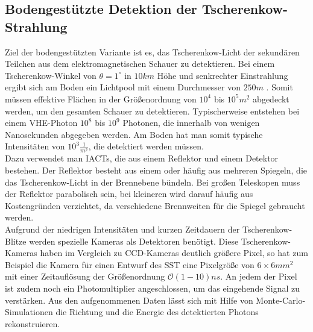 \subsection{Bodengestützte Detektion der Tscherenkow-Strahlung}
Ziel der bodengestützten Variante ist es, das Tscherenkow-Licht der sekundären Teilchen aus dem elektromagnetischen Schauer zu detektieren. Bei einem Tscherenkow-Winkel von $\theta=1^{\circ}$ in $10\unit{km}$ Höhe und senkrechter Einstrahlung ergibt sich am Boden ein Lichtpool mit einem Durchmesser von $250\unit{m}$ \cite{DesignConcept}. Somit müssen effektive Flächen in der Größenordnung von $10^4$ bis $10^5\unit{m^2}$ abgedeckt werden, um den gesamten Schauer zu detektieren. Typischerweise entstehen bei einem VHE-Photon $10^8$ bis $10^9$ Photonen, die innerhalb von wenigen Nanosekunden abgegeben werden. Am Boden hat man somit typische Intensitäten von $10^3\unit{\frac{1}{m^2}}$, die detektiert werden müssen.\\
Dazu verwendet man IACTs, die aus einem Reflektor und einem Detektor bestehen. Der Reflektor besteht aus einem oder häufig aus mehreren Spiegeln, die das Tscherenkow-Licht in der Brennebene bündeln. Bei großen Teleskopen muss der Reflektor parabolisch sein, bei kleineren wird darauf häufig aus Kostengründen verzichtet, da verschiedene Brennweiten für die Spiegel gebraucht werden.\\
Aufgrund der niedrigen Intensitäten und kurzen Zeitdauern der Tscherenkow-Blitze werden spezielle Kameras als Detektoren benötigt. Diese Tscherenkow-Kameras haben im Vergleich zu CCD-Kameras deutlich größere Pixel, so hat zum Beispiel die Kamera für einen Entwurf des SST \cite{gct} eine Pixelgröße von $6 \times 6\unit{mm^2}$ mit einer Zeitauflösung der Größenordnung $\mathcal{O}(1-10)\unit{ns}$. An jedem der Pixel ist zudem noch ein Photomultiplier angeschlossen, um das eingehende Signal zu verstärken. Aus den aufgenommenen Daten lässt sich mit Hilfe von Monte-Carlo-Simulationen die Richtung und die Energie des detektierten Photons rekonstruieren. 

